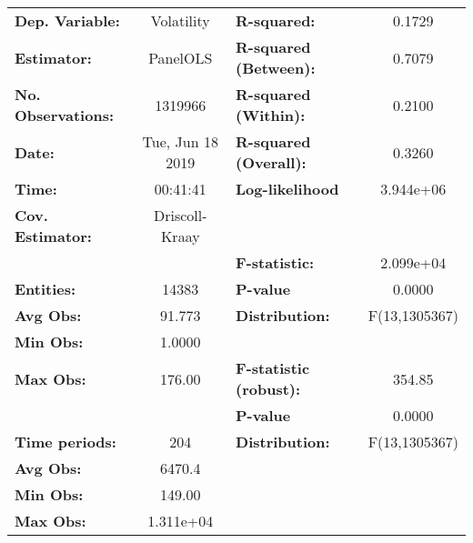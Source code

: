 \begin{center}
\begin{tabular}{lclc}
\toprule
\textbf{Dep. Variable:}                 &     Volatility     & \textbf{  R-squared:         }   &      0.1729      \\
\textbf{Estimator:}                     &      PanelOLS      & \textbf{  R-squared (Between):}  &      0.7079      \\
\textbf{No. Observations:}              &      1319966       & \textbf{  R-squared (Within):}   &      0.2100      \\
\textbf{Date:}                          &  Tue, Jun 18 2019  & \textbf{  R-squared (Overall):}  &      0.3260      \\
\textbf{Time:}                          &      00:41:41      & \textbf{  Log-likelihood     }   &    3.944e+06     \\
\textbf{Cov. Estimator:}                &   Driscoll-Kraay   & \textbf{                     }   &                  \\
\textbf{}                               &                    & \textbf{  F-statistic:       }   &    2.099e+04     \\
\textbf{Entities:}                      &       14383        & \textbf{  P-value            }   &      0.0000      \\
\textbf{Avg Obs:}                       &       91.773       & \textbf{  Distribution:      }   &  F(13,1305367)   \\
\textbf{Min Obs:}                       &       1.0000       & \textbf{                     }   &                  \\
\textbf{Max Obs:}                       &       176.00       & \textbf{  F-statistic (robust):} &      354.85      \\
\textbf{}                               &                    & \textbf{  P-value            }   &      0.0000      \\
\textbf{Time periods:}                  &        204         & \textbf{  Distribution:      }   &  F(13,1305367)   \\
\textbf{Avg Obs:}                       &       6470.4       & \textbf{                     }   &                  \\
\textbf{Min Obs:}                       &       149.00       & \textbf{                     }   &                  \\
\textbf{Max Obs:}                       &     1.311e+04      & \textbf{                     }   &                  \\

\end{tabular}
\end{center}
